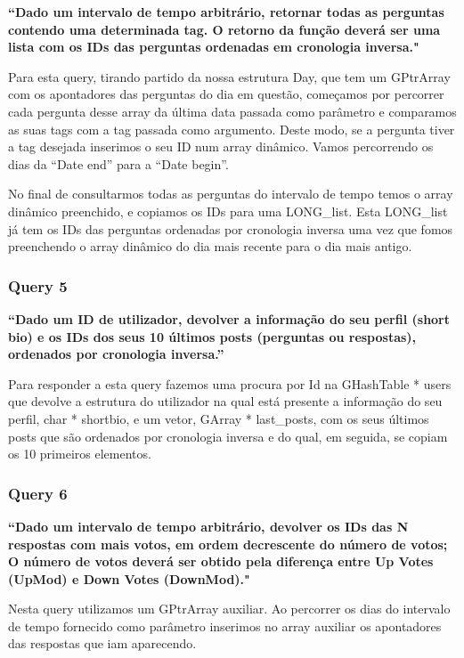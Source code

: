 \documentclass[a4paper]{article}
\begin{document}
\textbf{“Dado um intervalo de tempo arbitrário, retornar todas as perguntas contendo uma determinada tag.
O retorno da função deverá ser uma lista com os IDs das perguntas ordenadas em cronologia inversa."}

Para esta query, tirando partido da nossa estrutura Day, que tem um GPtrArray com
os apontadores das perguntas do dia em questão, começamos por percorrer cada pergunta desse array
da última data passada como parâmetro e comparamos as suas tags com a tag passada como argumento.
Deste modo, se a pergunta tiver a tag desejada inserimos o seu ID num array dinâmico.
Vamos percorrendo os dias da “Date end” para a “Date begin”.

No final de consultarmos todas as perguntas do intervalo de tempo temos o array dinâmico preenchido,
e copiamos os IDs para uma LONG\_list.
Esta LONG\_list já tem os IDs das perguntas ordenadas por cronologia inversa uma vez que
fomos preenchendo o array dinâmico do dia mais recente para o dia mais antigo.



\subsubsection*{Query 5}
\label{sec:query5}

\textbf{“Dado um ID de utilizador,  devolver a informação do
seu perfil (short bio) e os IDs dos seus 10 últimos posts (perguntas ou respostas),
ordenados por cronologia inversa.”}

Para responder a esta query fazemos uma procura por Id na GHashTable * users que devolve
a estrutura do utilizador na qual está presente a informação do
seu perfil, char * shortbio, e um vetor, GArray * last\_posts, com os seus últimos posts que são
ordenados por cronologia inversa e do qual, em seguida, se copiam os 10 primeiros
elementos.

\subsubsection*{Query 6}
\label{sec:query6}

\textbf{“Dado um intervalo de tempo arbitrário, devolver os IDs das N respostas
com mais votos, em ordem decrescente do número de votos; O número de votos deverá
ser obtido pela diferença entre Up Votes (UpMod) e Down Votes (DownMod)."}

Nesta query utilizamos um GPtrArray auxiliar. Ao percorrer os dias do intervalo
de tempo fornecido como parâmetro inserimos no array auxiliar os apontadores das
respostas que iam aparecendo.
\end{document}
